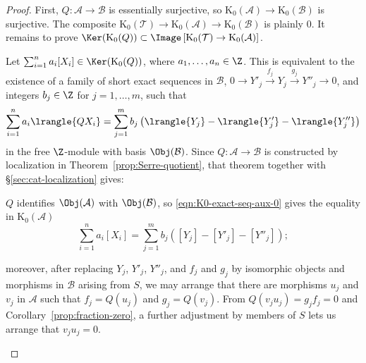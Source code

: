 \begin{proof}
First, $Q:\mathcal{A}\to\mathcal{B}$ is essentially surjective, so
$\mathrm{K}_0(\mathcal{A})\to\mathrm{K}_0(\mathcal{B})$ is surjective. The
composite $\mathrm{K}_0(\mathcal{T})\to\mathrm{K}_0(\mathcal{A})
\to\mathrm{K}_0(\mathcal{B})$ is plainly $0$. It remains to prove
$\Ker(\mathrm{K}_0(Q))\subset
\Image\left[\mathrm{K}_0(\mathcal{T})\to
\mathrm{K}_0(\mathcal{A})\right]$.

Let $\sum_{i=1}^n a_i[X_i]\in\Ker(\mathrm{K}_0(Q))$, where
$a_1,\ldots,a_n\in\Z$. This is equivalent to the existence of a family of
short exact sequences in $\mathcal{B}$,
$0\to Y'_j\xrightarrow{f_j}Y_j\xrightarrow{g_j}Y''_j\to0$, and integers
$b_j\in\Z$ for $j=1,\ldots,m$, such that
\begin{equation}\label{eqn:K0-exact-seq-aux-0}
\sum_{i=1}^n a_i\lrangle{QX_i}
=\sum_{j=1}^m b_j
\left(\lrangle{Y_j}-\lrangle{Y'_j}-\lrangle{Y''_j}\right)
\end{equation}
in the free $\Z$-module with basis $\Obj(\mathcal{B})$. Since
$Q:\mathcal{A}\to\mathcal{B}$ is constructed by localization in
Theorem~\ref{prop:Serre-quotient}, that theorem together with
\S\ref{sec:cat-localization} gives:
\begin{compactitem}
	\item $Q$ identifies $\Obj(\mathcal{A})$ with $\Obj(\mathcal{B})$, so
	\eqref{eqn:K0-exact-seq-aux-0} gives the equality in
	$\mathrm{K}_0(\mathcal{A})$
	\begin{equation}\label{eqn:K0-exact-seq-aux-1}
	\sum_{i=1}^n a_i[X_i]
	=\sum_{j=1}^m b_j\left([Y_j]-[Y'_j]-[Y''_j]\right);
	\end{equation}
	\item moreover, after replacing $Y_j$, $Y'_j$, $Y''_j$, and $f_j$ and $g_j$ by
	isomorphic objects and morphisms in $\mathcal{B}$ arising from $S$, we may
	arrange that there are morphisms $u_j$ and $v_j$ in $\mathcal{A}$ such that
	$f_j=Q(u_j)$ and $g_j=Q(v_j)$. From
	$Q(v_ju_j)=g_jf_j=0$ and Corollary~\ref{prop:fraction-zero}, a further
	adjustment by members of $S$ lets us arrange that $v_ju_j=0$.
\end{compactitem}


\end{proof}
